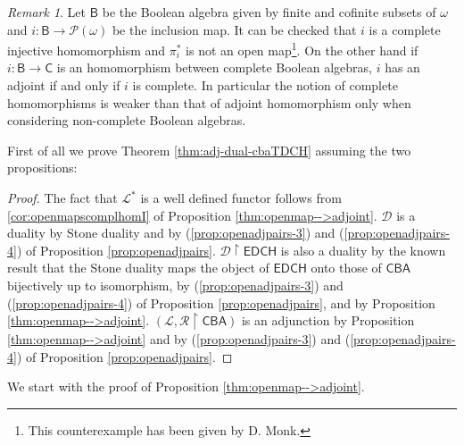 \documentclass[11pt]{amsart}
\theoremstyle{plain}
\theoremstyle{definition}
\theoremstyle{plain}
\theoremstyle{remark}
\newtheorem{remark}[theorem]{Remark}
\newcommand{\bool}[1]{\mathsf{#1}}
\newcommand{\pow}[1]{\mathcal{P}\left(#1\right)}
\newcommand{\0}{\mathsf{0}}
\renewcommand{\1}{\mathsf{1}}
\renewcommand{\2}{\mathsf{2}}
\theoremstyle{definition}
\begin{document}
\begin{remark}
Let $\bool{B}$ be the Boolean algebra given by finite and cofinite subsets of $\omega$ and
$i:\bool{B}\to\pow{\omega}$ be the inclusion map. It can be checked that $i$ is a complete injective 
homomorphism
and $\pi^*_i$ is not an open map\footnote{This counterexample has been given by D. Monk.}.
On the other hand if $i:\bool{B}\to\bool{C}$ is an homomorphism between complete Boolean algebras, 
$i$ has an adjoint if and only if $i$ is complete.
In particular the notion of complete homomorphisms is weaker than that of 
adjoint homomorphism only when considering non-complete Boolean algebras. 
\end{remark}

First of all we prove Theorem \ref{thm:adj-dual-cbaTDCH} assuming the two propositions:
\begin{proof}
The fact that $\mathcal{L}^*$ is a well defined functor follows from \ref{cor:openmapscomplhomI} of
Proposition \ref{thm:openmap-->adjoint}.
 $\mathcal{D}$ is a duality by Stone duality and by (\ref{prop:openadjpairs-3}) and (\ref{prop:openadjpairs-4}) of Proposition \ref{prop:openadjpairs}. $\mathcal{D}\restriction\bool{EDCH}$ is also a duality by
the known result that the Stone duality maps the object of $\bool{EDCH}$ onto those of $\bool{CBA}$
bijectively up to isomorphism, by (\ref{prop:openadjpairs-3}) and (\ref{prop:openadjpairs-4}) of Proposition \ref{prop:openadjpairs}, and by
Proposition \ref{thm:openmap-->adjoint}. $(\mathcal{L},\mathcal{R}\restriction\bool{CBA})$ is an adjunction by Proposition \ref{thm:openmap-->adjoint} and by (\ref{prop:openadjpairs-3}) and (\ref{prop:openadjpairs-4}) of Proposition \ref{prop:openadjpairs}.
\end{proof}
We start with the proof of Proposition \ref{thm:openmap-->adjoint}.
\end{document}
